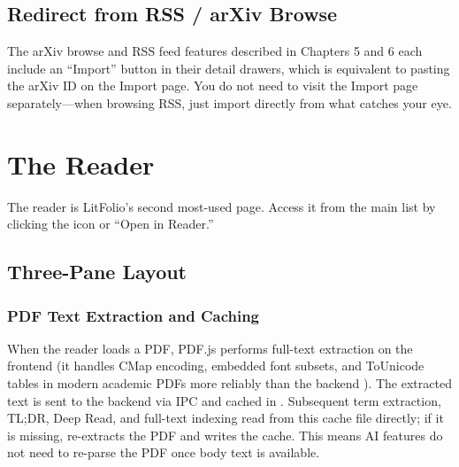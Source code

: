 \section{Redirect from RSS / arXiv Browse}

The arXiv browse and RSS feed features described in Chapters 5 and 6 each include an
``Import'' button in their detail drawers, which is equivalent to pasting the arXiv ID
on the Import page. You do not need to visit the Import page
separately---when browsing RSS, just import directly from what catches your eye.

\chapter{The Reader}
\label{ch:reader}

The reader is LitFolio's second most-used page. Access it from the main list by
clicking the  icon or ``Open in Reader.''

\section{Three-Pane Layout}
\subsection{PDF Text Extraction and Caching}

When the reader loads a PDF, PDF.js performs full-text extraction on the frontend
(it handles CMap encoding, embedded font subsets, and ToUnicode tables in modern
academic PDFs more reliably than the backend ). The extracted text is
sent to the backend via IPC and cached in . Subsequent
term extraction, TL;DR, Deep Read, and full-text indexing read from this cache file
directly; if it is missing,  re-extracts the PDF and writes the cache.
This means AI features do not need to re-parse the PDF once body text is available.


